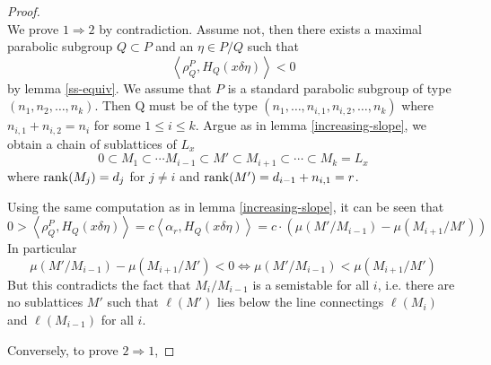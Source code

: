 \begin{proof}
    \hfill \\
    We prove $1 \Rightarrow 2$ by contradiction. Assume not, then there exists a maximal
    parabolic subgroup $Q \subset P$ and an $\eta \in P/Q$ such that
    \[\left\langle \rho_Q^P, H_Q(x\delta\eta) \right\rangle < 0\]
    by lemma \ref{ss-equiv}. We assume that $P$ is a standard parabolic subgroup of type $(n_1,n_2,\ldots,n_k)$. Then
    Q must be of the type $(n_1,\ldots, n_{i,1},n_{i,2},\ldots,n_k)$ where $n_{i,1}+n_{i,2} = n_i$
    for some $1 \le i \le k$.  Argue as in lemma \ref{increasing-slope}, we obtain a chain of sublattices of $L_x$
    \[0 \subset M_{1} \subset \cdots M_{{i-1}} \subset M'\subset M_{{i+1}} \subset \cdots \subset M_{k} = L_x\]
    where $\operatorname{rank}(M_j)=d_j$ for $j \ne i$ and $\operatorname{rank}(M') = d_{i-1}+n_{i,1} =r$. 

    Using the same computation as in lemma \ref{increasing-slope}, it can be seen that 
    \[0 > \left\langle\rho_Q^P, H_Q(x\delta\eta)\right\rangle = c \left\langle \alpha_r,H_Q(x\delta\eta) \right\rangle= c\cdot\left(\mu(M'/M_{i-1})-\mu(M_{i+1}/M')\right) \]
    In particular
    \[\mu(M'/M_{i-1})-\mu(M_{i+1}/M') < 0 \Leftrightarrow \mu(M'/M_{i-1})<\mu(M_{i+1}/M')\]
    But this contradicts the fact that $M_i/M_{i-1}$ is a semistable for all $i$, i.e. 
    there are no sublattices $M'$ such that $\ell(M')$ lies below the line connectings 
    $\ell(M_i)$ and $\ell(M_{i-1})$ for all $i$. 
    \begin{figure}[hbt]
        \centering
        \caption{}
        \label{figureproof}
    \end{figure}

Conversely, to prove $2 \Rightarrow 1$,
\end{proof}